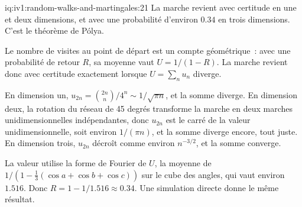 \begin{solution}{iq:iv1:random-walks-and-martingales:21}
La marche revient avec certitude en une et deux dimensions, et avec une probabilité d'environ $0.34$ en trois dimensions. C'est le théorème de Pólya.

Le nombre de visites au point de départ est un compte géométrique~: avec une probabilité de retour $R$, sa moyenne vaut $U = 1/(1 - R)$. La marche revient donc avec certitude exactement lorsque $U = \sum_n u_n$ diverge.

En dimension un, $u_{2n} = \binom{2n}{n}/4^n \sim 1/\sqrt{\pi n}$, et la somme diverge. En dimension deux, la rotation du réseau de 45 degrés transforme la marche en deux marches unidimensionnelles indépendantes, donc $u_{2n}$ est le carré de la valeur unidimensionnelle, soit environ $1/(\pi n)$, et la somme diverge encore, tout juste. En dimension trois, $u_{2n}$ décroît comme environ $n^{-3/2}$, et la somme converge.

La valeur utilise la forme de Fourier de $U$, la moyenne de $1/(1 - \tfrac13(\cos a + \cos b + \cos c))$ sur le cube des angles, qui vaut environ $1.516$. Donc $R = 1 - 1/1.516 \approx 0.34$. Une simulation directe donne le même résultat.

\end{solution}


